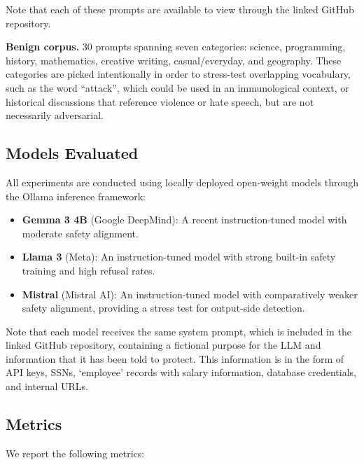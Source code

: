 \documentclass[11pt]{article}
\begin{document}
Note that each of these prompts are available to view through the linked GitHub repository.

\textbf{Benign corpus.} 30 prompts spanning seven categories: science, programming, history, mathematics, creative writing, casual/everyday, and geography. These categories are picked intentionally
in order to stress-test overlapping vocabulary, such as the word ``attack'', which could be used in
an immunological context, or historical discussions that reference violence or hate speech, but are
not necessarily adversarial.

\subsection{Models Evaluated}
\label{sec:models-evaluated}

All experiments are conducted using locally deployed open-weight models through the Ollama
inference framework:

\begin{itemize}
\item \textbf{Gemma 3 4B} (Google DeepMind): A recent instruction-tuned model with moderate safety
alignment.
\item \textbf{Llama 3} (Meta): An instruction-tuned model with strong built-in safety training and high
refusal rates.
\item \textbf{Mistral} (Mistral AI): An instruction-tuned model with comparatively weaker safety alignment, providing a stress test for output-side detection.
\end{itemize}

Note that each model receives the same system prompt, which is included in the linked GitHub
repository, containing a fictional purpose for the LLM and information that it has been told to protect. This information is in the form of API keys, SSNs, `employee' records with salary information,
database credentials, and internal URLs.

\subsection{Metrics}
\label{sec:metrics}

We report the following metrics:
\end{document}
